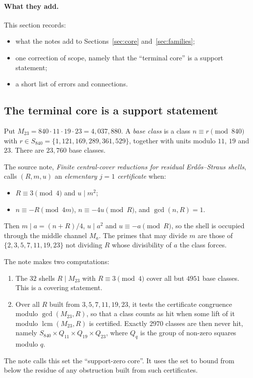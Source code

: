 \paragraph{What they add.}
This section records:
\begin{itemize}
\item what the notes add to Sections~\ref{sec:core} and~\ref{sec:families};
\item one correction of scope, namely that the ``terminal core'' is a support statement;
\item a short list of errors and connections.
\end{itemize}

\subsection{The terminal core is a support statement}\label{ssec:termcore}

Put $M_{23}=840\cdot11\cdot19\cdot23=4{,}037{,}880$. A \emph{base class} is a class $n\equiv r\pmod{840}$ with $r\in S_{840}=\{1,121,169,289,361,529\}$, together with units modulo $11$, $19$ and $23$. There are $23{,}760$ base classes.

The source note, \emph{Finite central-cover reductions for residual Erdős--Straus shells}, calls $(R,m,u)$ an \emph{elementary $j=1$ certificate} when:
\begin{itemize}
\item $R\equiv3\pmod4$ and $u\mid m^2$;
\item $n\equiv-R\pmod{4m}$, $n\equiv-4u\pmod R$, and $\gcd(n,R)=1$.
\end{itemize}
Then $m\mid a=(n+R)/4$, $u\mid a^2$ and $u\equiv-a\pmod R$, so the shell is occupied through the middle channel $M_a$. The primes that may divide $m$ are those of $\{2,3,5,7,11,19,23\}$ not dividing $R$ whose divisibility of $a$ the class forces.

The note makes two computations:
\begin{enumerate}[label=(\roman*)]
\item The $32$ shells $R\mid M_{23}$ with $R\equiv3\pmod4$ cover all but $4951$ base classes. This is a covering statement.
\item Over all $R$ built from $3,5,7,11,19,23$, it tests the certificate congruence modulo $\gcd(M_{23},R)$, so that a class counts as hit when some lift of it modulo $\operatorname{lcm}(M_{23},R)$ is certified. Exactly $2970$ classes are then never hit, namely $S_{840}\times Q_{11}\times Q_{19}\times Q_{23}$, where $Q_q$ is the group of non-zero squares modulo $q$.
\end{enumerate}
The note calls this set the ``support-zero core''. It uses the set to bound from below the residue of any obstruction built from such certificates.

